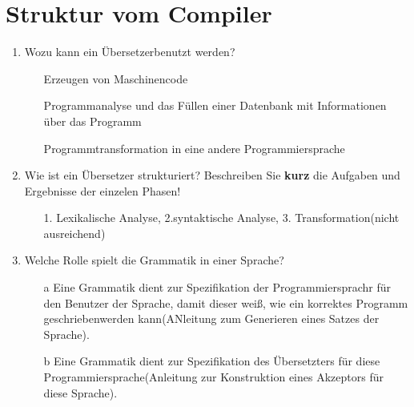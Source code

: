 \section{Struktur vom Compiler}
\begin{enumerate}
  \item Wozu kann ein Übersetzerbenutzt werden?
  \begin{itemize}
    \item [] Erzeugen von Maschinencode 
    \item [] Programmanalyse und das Füllen einer Datenbank mit Informationen über das Programm
    \item [] Programmtransformation in eine andere Programmiersprache
  \end{itemize}
  \item Wie ist ein Übersetzer strukturiert? Beschreiben Sie \textbf{kurz} die Aufgaben und Ergebnisse der einzelen Phasen!
  \begin{itemize}
    \item []1. Lexikalische Analyse, 2.syntaktische Analyse, 3. Transformation(nicht ausreichend)
  \end{itemize}
  \item Welche Rolle spielt die Grammatik in einer Sprache?
  \begin{itemize}
    \item [a]Eine Grammatik dient zur Spezifikation der Programmiersprachr für den Benutzer der Sprache, damit dieser weiß, wie ein korrektes Programm geschriebenwerden kann(ANleitung zum Generieren eines Satzes der Sprache).
    \item [b]Eine Grammatik dient zur Spezifikation des Übersetzters für diese Programmiersprache(Anleitung zur Konstruktion eines Akzeptors für diese Sprache).
  \end{itemize}
\end{enumerate}